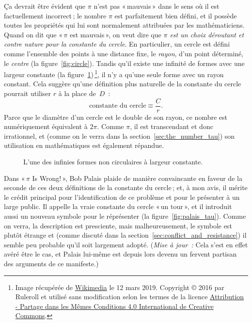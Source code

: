 Ça devrait être évident que $\pi$ n'est pas «\,mauvais\,» dans le sens où il
est factuellement incorrect\,; le nombre $\pi$ est parfaitement bien défini,
et il possède toutes les propriétés qui lui sont normalement attribuées par
les mathématiciens. Quand on dit que «\,$\pi$ est mauvais\,», on veut dire que
\emph{$\pi$ est un choix déroutant et contre nature pour la constante du
cercle}. En particulier, un cercle est défini comme l'ensemble des points à
une distance fixe, le \emph{rayon}, d'un point déterminé, le \emph{centre} (la
figure~\ref{fig:circle}). Tandis qu'il existe une infinité de formes avec une
largeur constante (la figure~\ref{fig:constant_width})\,\footnote{Image
récupérée de
\href{https://commons.wikimedia.org/wiki/File:Reuleaux_triangle_roll.gif}{Wikimedia}
le 12 mars 2019. Copyright © 2016 par Ruleroll et utilisé sans
modification selon les termes de la licence
\href{https://creativecommons.org/licenses/by-sa/4.0/deed.fr}{Attribution -
Partage dans les Mêmes Conditions 4.0 International de Creative Commons}.}, il
n'y a qu'une seule forme avec un rayon constant. Cela suggère qu'une
définition plus naturelle de la constante du cercle pourrait utiliser $r$ à la
place de~$D$~:
\begin{equation}
\label{eq:circle_constant}
\mbox{constante du cercle} \equiv \frac{C}{r}.
\end{equation}
Parce que le diamètre d'un cercle est le double de son rayon, ce nombre est
numériquement équivalent à $2\pi$. Comme $\pi$, il est transcendant et donc
irrationnel, et (comme on le verra dans la section~\ref{sec:the_number_tau})
son utilisation en mathématiques est également répandue.

\begin{figure}
\caption{L'une des infinies formes non circulaires à largeur
constante.\label{fig:constant_width}}
\end{figure}

Dans «\,$\pi$ Is Wrong!\,», Bob Palais plaide de manière convaincante en faveur
de la seconde de ces deux définitions de la constante du cercle\,; et, à mon
avis, il mérite le crédit principal pour l'identification de ce problème et pour
le présenter à un large public. Il appelle la vraie constante du cercle «\,un
tour\,», et il introduit aussi un nouveau symbole pour le réprésenter (la
figure~\ref{fig:palais_tau}). Comme on verra, la description est presciente,
mais malheureusement, le symbole est plutôt étrange et (comme discuté dans la
section~\ref{sec:conflict_and_resistance}) il semble peu probable qu'il soit
largement adopté. (\emph{Mise à jour~:} Cela s'est en effet avéré être le cas,
et Palais lui-même est depuis lors devenu un fervent partisan des arguments de
ce manifeste.)

